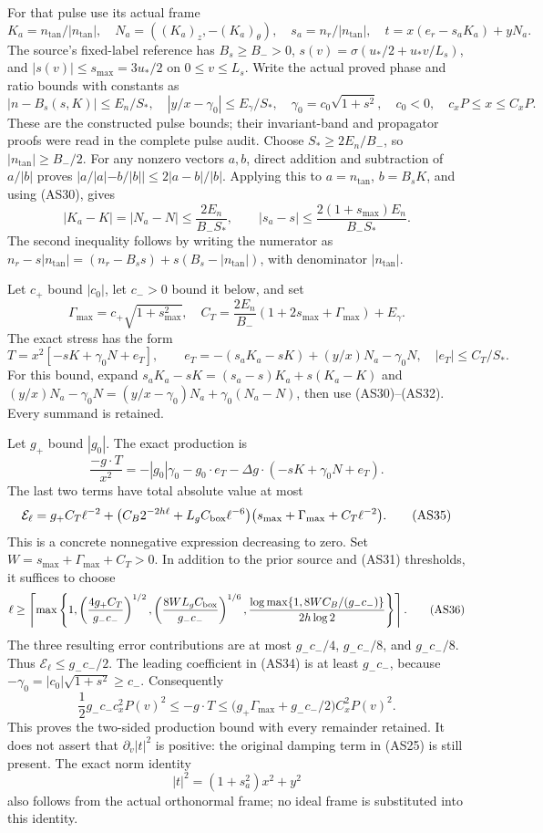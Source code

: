 \documentclass[10pt,a4paper]{article}
\begin{document}
For that pulse use its actual frame \[
K_a=n_{\tan}/|n_{\tan}|,\quad N_a=((K_a)_z,-(K_a)_\theta),
\quad s_a=n_r/|n_{\tan}|,\quad
t=x(e_r-s_aK_a)+yN_a.
\tag{AS29}
\] The source's fixed-label reference has \(B_s\ge B_->0\), \(s(v)=\sigma(u_*/2+u_*v/L_s)\), and \(|s(v)|\le s_{\max}=3u_*/2\) on \(0\le v\le L_s\). Write the actual proved phase and ratio bounds with constants as \[
|n-B_s(s,K)|\le E_n/S_*,\quad
|y/x-\gamma_0|\le E_\gamma/S_*,\quad
\gamma_0=c_0\sqrt{1+s^2},\quad c_0<0,
\quad c_xP\le x\le C_xP.
\tag{AS30}
\] These are the constructed pulse bounds; their invariant-band and propagator proofs were read in the complete pulse audit. Choose \(S_*\ge2E_n/B_-\), so \(|n_{\tan}|\ge B_-/2\). For any nonzero vectors \(a,b\), direct addition and subtraction of \(a/|b|\) proves \(|a/|a|-b/|b||\le2|a-b|/|b|\). Applying this to \(a=n_{\tan}\), \(b=B_sK\), and using (AS30), gives \[
|K_a-K|=|N_a-N|\le\frac{2E_n}{B_-S_*},
\qquad
|s_a-s|\le\frac{2(1+s_{\max})E_n}{B_-S_*}.
\tag{AS31}
\] The second inequality follows by writing the numerator as \(n_r-s|n_{\tan}|=(n_r-B_ss)+s(B_s-|n_{\tan}|)\), with denominator \(|n_{\tan}|\).

Let \(c_+\) bound \(|c_0|\), let \(c_->0\) bound it below, and set \[
\Gamma_{\max}=c_+\sqrt{1+s_{\max}^2},\quad
C_T=\frac{2E_n}{B_-}(1+2s_{\max}+\Gamma_{\max})+E_\gamma.
\tag{AS32}
\] The exact stress has the form \[
T=x^2[-sK+\gamma_0N+e_T],\qquad
e_T=-(s_aK_a-sK)+(y/x)N_a-\gamma_0N,
\quad |e_T|\le C_T/S_*.
\tag{AS33}
\] For this bound, expand \(s_aK_a-sK=(s_a-s)K_a+s(K_a-K)\) and \((y/x)N_a-\gamma_0N=(y/x-\gamma_0)N_a+\gamma_0(N_a-N)\), then use (AS30)--(AS32). Every summand is retained.

Let \(g_+\) bound \(|g_0|\). The exact production is \[
\frac{-g\cdot T}{x^2}=-|g_0|\gamma_0
-g_0\cdot e_T-\Delta g\cdot(-sK+\gamma_0N+e_T).
\tag{AS34}
\] The last two terms have total absolute value at most \[
\mathcal E_\ell=
g_+C_T\ell^{-2}
+\bigl(C_B2^{-2h\ell}+L_gC_{\rm box}\ell^{-6}\bigr)
\bigl(s_{\max}+\Gamma_{\max}+C_T\ell^{-2}\bigr).
\tag{AS35}
\] This is a concrete nonnegative expression decreasing to zero. Set \(W=s_{\max}+\Gamma_{\max}+C_T>0\). In addition to the prior source and (AS31) thresholds, it suffices to choose \[
\ell\ge\left\lceil\max\left\{
1,\left(\frac{4g_+C_T}{g_-c_-}\right)^{1/2},
\left(\frac{8WL_gC_{\rm box}}{g_-c_-}\right)^{1/6},
\frac{\log\max\{1,8WC_B/(g_-c_-)\}}{2h\log2}
\right\}\right\rceil.
\tag{AS36}
\] The three resulting error contributions are at most \(g_-c_-/4\), \(g_-c_-/8\), and \(g_-c_-/8\). Thus \(\mathcal E_\ell\le g_-c_-/2\). The leading coefficient in (AS34) is at least \(g_-c_-\), because \(-\gamma_0=|c_0|\sqrt{1+s^2}\ge c_-\). Consequently \[
\frac12g_-c_-c_x^2P(v)^2\le -g\cdot T
\le\bigl(g_+\Gamma_{\max}+g_-c_-/2\bigr)C_x^2P(v)^2.
\tag{AS37}
\] This proves the two-sided production bound with every remainder retained. It does not assert that \(\partial_v|t|^2\) is positive: the original damping term in (AS25) is still present. The exact norm identity \[
|t|^2=(1+s_a^2)x^2+y^2
\tag{AS38}
\] also follows from the actual orthonormal frame; no ideal frame is substituted into this identity.
\end{document}
